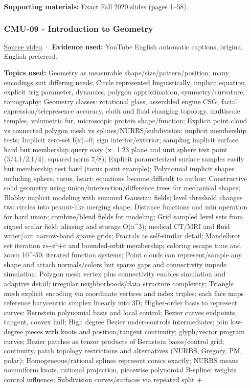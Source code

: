 \textbf{Supporting materials:} \href{https://15462.courses.cs.cmu.edu/fall2020content/lectures/08_depthtransparency/08_depthtransparency_slides.pdf}{Exact Fall 2020 slides} (pages 1--58).

\subsubsection{CMU-09 - Introduction to Geometry}\label{04-visual-computing-ii-ch036-cmu-09---introduction-to-geometry}

\href{https://www.youtube.com/watch?v=MakhXtIX2YM}{Source video} · \textbf{Evidence used:} YouTube English automatic captions, original English preferred.

\textbf{Topics used:} Geometry as measurable shape/size/pattern/position; many encodings suit differing needs; Circle represented linguistically, implicit equation, explicit trig parameter, dynamics, polygon approximation, symmetry/curvature, tomography; Geometry classes: rotational glass, assembled engine CSG, facial expression/telepresence accuracy, cloth and fluid changing topology, multiscale temples, volumetric fur, microscopic protein shape/function; Explicit point cloud vs connected polygon mesh vs splines/NURBS/subdivision; implicit membership tests; Implicit zero-set f(x)=0, sign interior/exterior; sampling implicit surface hard but membership query easy (x=1.23 plane and unit sphere test point (3/4,1/2,1/4), squared norm 7/8); Explicit parameterized surface samples easily but membership test hard (torus point example); Polynomial implicit shapes including sphere, torus, heart; equations become difficult to author; Constructive solid geometry using union/intersection/difference trees for mechanical shapes; Blobby implicit modeling with summed Gaussian fields; level threshold changes two circles into peanut-like merging shape; Distance functions and min operation for hard union; combine/blend fields for modeling; Grid sampled level sets from signed scalar field; aliasing and storage O(n\^{}3); medical CT/MRI and fluid water/air; narrow-band sparse grids; Fractals as self-similar detail; Mandelbrot set iteration z←z²+c and bounded-orbit membership; coloring escape time and zoom 10\^{}-50; iterated function systems; Point clouds can represent/sample any shape and attach normals/colors but sparse gaps and connectivity impede simulation; Polygon mesh vertex plus connectivity enables simulation and adaptive detail; irregular neighborhoods/data structure complexity; Triangle mesh explicit encoding via coordinate vertices and index triples; each face maps reference barycentric simplex linearly into 3D; Higher-order basis to represent curves: Bernstein polynomial basis and local control; Bezier curves endpoints, tangent, convex hull; High degree Bezier under-controls intermediates; join low-degree pieces with knots and position/tangent continuity; glyph/vector program curves; Bezier patches as tensor products of Bernstein bases/control grid; continuity, patch topology restrictions and alternatives (NURBS, Gregory, PM, polar); Homogeneous/rational splines represent conics exactly; NURBS means nonuniform knots, rational projection, piecewise polynomial B-spline; weights control influence; Subdivision curves/surfaces via repeated split + 
